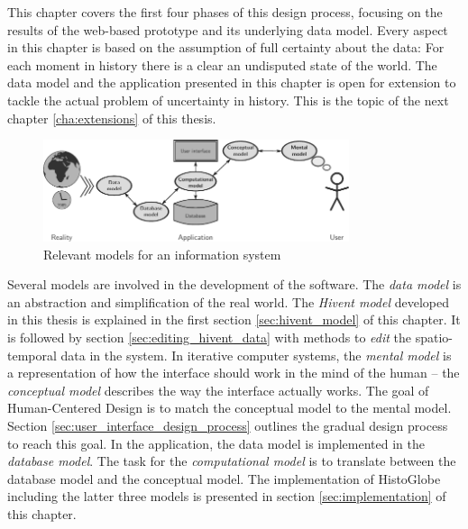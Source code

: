 This chapter covers the first four phases of this design process, focusing on the results of the web-based prototype and its underlying data model. Every aspect in this chapter is based on the assumption of full certainty about the data: For each moment in history there is a clear an undisputed state of the world. The data model and the application presented in this chapter is open for extension to tackle the actual problem of uncertainty in history. This is the topic of the next chapter \ref{cha:extensions} of this thesis.

\begin{figure}[H]
  \vspace{1.5em}
  \centering
  \includegraphics[width=0.8\textwidth]{graphics/development/models}
  \caption{Relevant models for an information system}
  \label{fig:models}
\end{figure}

Several models are involved in the development of the software. The \emph{data model} is an abstraction and simplification of the real world. The \emph{Hivent model} developed in this thesis is explained in the first section \ref{sec:hivent_model} of this chapter. It is followed by section \ref{sec:editing_hivent_data} with methods to \emph{edit} the spatio-temporal data in the system. In iterative computer systems, the \emph{mental model} is a representation of how  the interface should work in the mind of the human -- the \emph{conceptual model} describes the way the interface actually works. The goal of Human-Centered Design is to match the conceptual model to the mental model. Section \ref{sec:user_interface_design_process} outlines the gradual design process to reach this goal. In the application, the data model is implemented in the \emph{database model}. The task for the \emph{computational model} is to translate between the database model and the conceptual model. The implementation of HistoGlobe including the latter three models is presented in section \ref{sec:implementation} of this chapter.

\newpage





